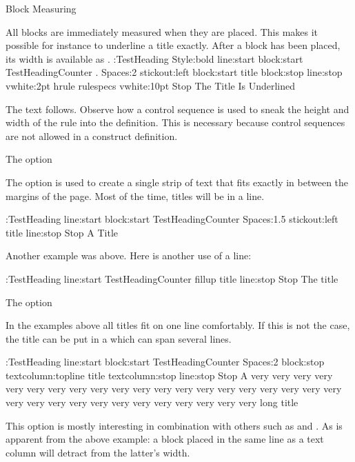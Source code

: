  Block Measuring

All blocks are immediately measured when they are placed. This makes it
possible for instance to underline a title exactly. After a block has
been placed, its width is available as .
 \Example
\def\rulespecs{height 1pt width \BlockWidth\relax}
\DefineHeading:TestHeading Style:bold
 line:start block:start TestHeadingCounter . Spaces:2 stickout:left
            block:start title block:stop line:stop
 vwhite:2pt hrule rulespecs vwhite:10pt Stop
\TestHeading The Title Is Underlined

The text follows.
\ExampleStop
Observe how a control sequence  is used to sneak the
height and width of the rule into the definition. This is necessary
because control sequences are not allowed in a construct definition.

 The  option

The option  is used to create a single strip of text that
fits exactly in between the margins of the page. Most of the time, titles
will be in a line. 

\Example
\DefineHeading:TestHeading
    line:start block:start TestHeadingCounter Spaces:1.5 stickout:left
               title line:stop Stop
\TestHeading A Title

\endExample

Another example was above. Here is another use of a line:

\Example
\DefineHeading:TestHeading
    line:start TestHeadingCounter fillup title line:stop Stop
\TestHeading The title

\endExample

 The  option

In the examples above all titles fit on one line comfortably. If this
is not the case, the title can be put in a  which can
span several lines.

\Example
\DefineHeading:TestHeading
    line:start block:start TestHeadingCounter Spaces:2 block:stop
               textcolumn:topline title textcolumn:stop
    line:stop Stop
\TestHeading A very very very very very very very very very very very
very very very very very very very very very very very very very
very very very very very very very very long title

\endExample

This option is mostly interesting in combination with others such as
 and . As is apparent from the above example: a
block placed in the same line as a text column will detract from the
latter's width. 

